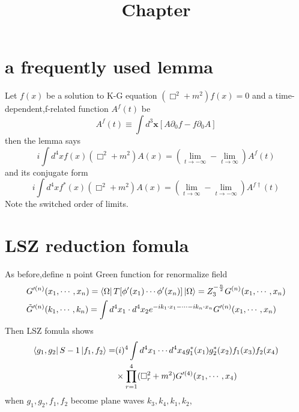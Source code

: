 \documentclass[a4paper]{article}
\begin{document}
	\title{Chapter}
	\date{ }
	\maketitle
\section{a frequently used lemma}
Let $f(x)$ be a solution to K-G equation $(\Box^2+m^2)f(x)=0$ and a time-dependent,f-related function $A^{f}(t)$ be$$A^f(t)\equiv\int d^3\bm{x}[A\partial_0f-f\partial_0A]$$then the lemma says$$i\int d^4xf(x)(\Box^2+m^2)A(x)=(\lim_{t\rightarrow-\infty}-\lim_{t\rightarrow\infty})A^f(t)$$and its conjugate form$$i\int d^4xf^*(x)(\Box^2+m^2)A(x)=(\lim_{t\rightarrow\infty}-\lim_{t\rightarrow-\infty})A^{f\dagger}(t)$$
Note the switched order of limits.
\section{LSZ reduction fomula}
As before,define n point Green function for renormalize field
\begin{align*}
	&G'^{(n)}(x_1,\cdots,x_n)=\bra{\Omega}T[\phi'(x_1)\cdots\phi'(x_n)]\ket{\Omega}=Z_3^{-\frac{n}{2}}G^{(n)}(x_1,\cdots,x_n)\\
	&\tilde{G}'^{(n)}(k_1,\cdots,k_n)=\int d^4x_1\cdot d^4x_2e^{-ik_1\cdot x_1-\cdots-ik_n\cdot x_n}G'^{(n)}(x_1,\cdots,x_n)
\end{align*}
Then LSZ fomula shows
\begin{align*}
	\bra{g_1,g_2}S-1\ket{f_1,f_2}=&(i)^4\int d^4x_1\cdots d^4x_4g_1^*(x_1)g_2^*(x_2)f_1(x_3)f_2(x_4)\\&\times\prod_{r=1}^{4}(\Box_r^2+m^2)G'^{(4)}(x_1,\cdots,x_4)\\
\end{align*}
when $g_1,g_2,f_1,f_2$ become plane waves $k_3,k_4,k_1,k_2$,
\end{document}
